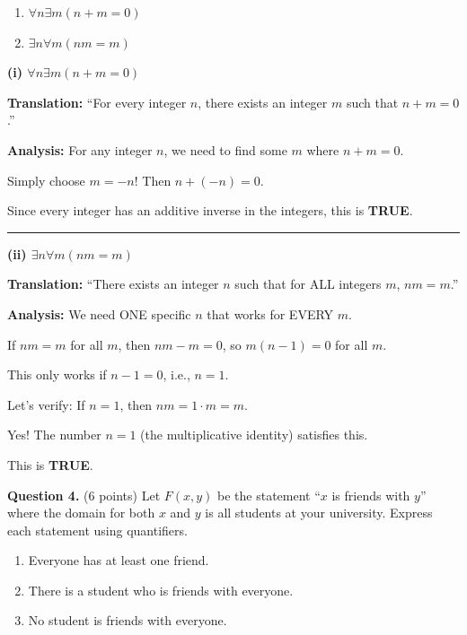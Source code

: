 \documentclass[11pt,a4paper]{article}
\begin{document}
\begin{enumerate}[label=(\roman*)]
    \item $\forall n \exists m (n + m = 0)$
    \item $\exists n \forall m (nm = m)$
\end{enumerate}

\begin{solnbox}
\textbf{(i) $\forall n \exists m (n + m = 0)$}

\textbf{Translation:} ``For every integer $n$, there exists an integer $m$ such that $n + m = 0$.''

\textbf{Analysis:} For any integer $n$, we need to find some $m$ where $n + m = 0$.

Simply choose $m = -n$! Then $n + (-n) = 0$. \checkmark

Since every integer has an additive inverse in the integers, this is \textbf{TRUE}.

\rule{\linewidth}{0.3pt}

\textbf{(ii) $\exists n \forall m (nm = m)$}

\textbf{Translation:} ``There exists an integer $n$ such that for ALL integers $m$, $nm = m$.''

\textbf{Analysis:} We need ONE specific $n$ that works for EVERY $m$.

If $nm = m$ for all $m$, then $nm - m = 0$, so $m(n-1) = 0$ for all $m$.

This only works if $n - 1 = 0$, i.e., $n = 1$.

Let's verify: If $n = 1$, then $nm = 1 \cdot m = m$. \checkmark

Yes! The number $n = 1$ (the multiplicative identity) satisfies this.

This is \textbf{TRUE}.
\end{solnbox}

\vspace{15pt}

\textbf{Question 4.} (6 points) Let $F(x, y)$ be the statement ``$x$ is friends with $y$'' where the domain for both $x$ and $y$ is all students at your university. Express each statement using quantifiers.

\begin{enumerate}[label=(\roman*)]
    \item Everyone has at least one friend.
    \item There is a student who is friends with everyone.
    \item No student is friends with everyone.
\end{enumerate}
\end{document}
